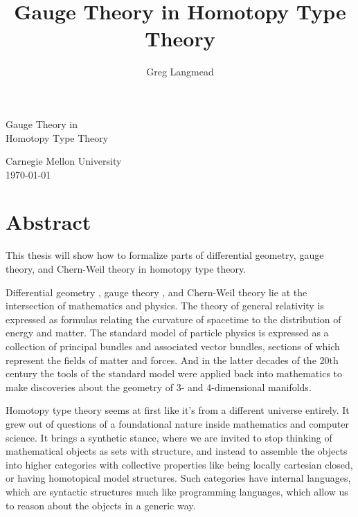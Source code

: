 \documentclass[12pt]{report}
\title{Gauge Theory in Homotopy Type Theory}
\author{Greg Langmead}
\begin{document}
\begin{titlepage}
\centering
\parbox[b]{2\textwidth}{
	\vspace{6\baselineskip}
	{\Huge\sffamily Gauge Theory in\\ Homotopy Type Theory}\\[2\baselineskip]
	{\Large{}}

	\vspace{0.47\textheight}
	{\noindent Carnegie Mellon University}\\[0.1\baselineskip]
	{\noindent \today}\\[\baselineskip]
}
\end{titlepage}

\chapter*{Abstract}
This thesis will show how to formalize parts of differential geometry, gauge theory, and Chern-Weil theory in homotopy type theory.

\tableofcontents

Differential geometry\cite{kobayashinomizu} \cite{baez1994gauge}, gauge theory \cite{hamilton2017} \cite{atiyah1983yang}, and Chern-Weil theory\cite{freed2013chernweil} lie at the intersection of mathematics and physics. The theory of general relativity is expressed as formulas relating the curvature of spacetime to the distribution of energy and matter. The standard model of particle physics is expressed as a collection of principal bundles and associated vector bundles, sections of which represent the fields of matter and forces. And in the latter decades of the 20th century the tools of the standard model were applied back into mathematics to make discoveries about the geometry of 3- and 4-dimensional manifolds\cite{scorpan_wild_2005}.

Homotopy type theory\cite{hottbook} seems at first like it's from a different universe entirely. It grew out of questions of a foundational nature inside mathematics and computer science. It brings a synthetic stance, where we are invited to stop thinking of mathematical objects as sets with structure, and instead to assemble the objects into higher categories with collective properties like being locally cartesian closed, or having homotopical model structures. Such categories have internal languages, which are syntactic structures much like programming languages, which allow us to reason about the objects in a generic way.
\end{document}

